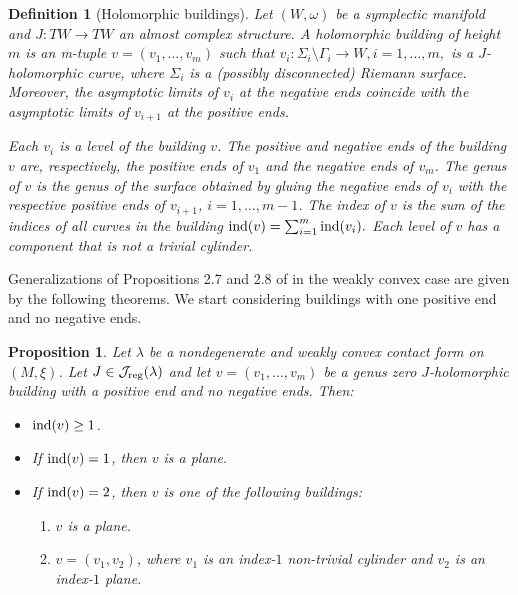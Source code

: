 \documentclass{amsart}
\newtheorem{prop}[theorem]{Proposition}
\newtheorem{definition}[theorem]{Definition}
\newcommand{\ind}{\textnormal{ind}}
\begin{document}
\begin{definition}[Holomorphic buildings] \label{def:bil}
Let $(W,\omega)$ be a symplectic manifold and $J:TW \to TW$ an almost complex structure. A holomorphic building of height $m$ is an m-tuple $v=(v_1,\ldots,v_m)$ such that $v_i:\Sigma_i \setminus \Gamma_i \to W, i=1,\ldots,m,$ is a $J$-holomorphic curve, where $\Sigma_i$ is a (possibly disconnected) Riemann surface.
Moreover, the asymptotic limits of $v_i$ at the negative ends  coincide with the asymptotic limits of $v_{i+1}$ at the positive ends.

Each  $v_i$ is a level of the building $v$. The positive and negative ends of the building $v$ are, respectively, the positive ends of $v_1$ and the negative ends of $v_m$. The genus of $v$ is  the genus of the surface obtained by gluing the negative ends of $v_i$ with the respective positive ends of $v_{i+1}$, $i=1,\ldots,m-1$. The index of $v$ is the sum of the indices of all curves in the building 
$
\ind(v) = \sum_{i=1}^m \ind(v_i).
$ Each level of $v$ has a component that is not a trivial cylinder.
 
\end{definition}


Generalizations of Propositions 2.7 and 2.8 of \cite{HN} in the weakly convex case are given by the following theorems. We start considering buildings with one positive end and no negative ends.

\begin{prop} \label{B} 
Let $\lambda$ be a nondegenerate and weakly convex contact form on $(M, \xi)$. Let $J\in \mathcal{J}_{\rm reg}(\lambda)$ and let $v=(v_1, \ldots, v_m)$ be a genus zero $J$-holomorphic building  with a positive end and no negative ends. Then:
\begin{itemize}
\item[(i)] $\ind(v) \geq 1$.
\item[(ii)] If $\ind(v)=1$, then $v$ is a plane.
\item[(iii)] If $\ind(v)=2$, then $v$ is one of the following buildings:
\begin{enumerate}[label=(iii.\arabic*)]
   \item $v$ is a plane.
   \item \label{itm:Bc2} $v=(v_1,v_2)$, where $v_1$ is an index-$1$ non-trivial cylinder and  $v_2$ is an index-$1$ plane.
\end{enumerate}
\end{itemize}
\end{prop}
\end{document}
